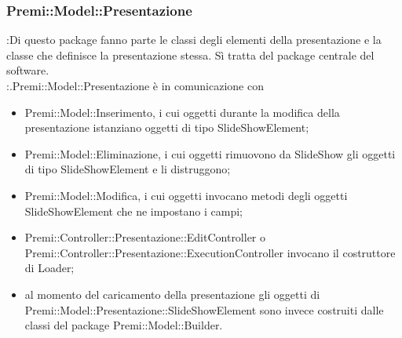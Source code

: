 {{{                    
                    
                     \subsubsection{Premi::Model::Presentazione}{
		\textbf{\tipo}:Di questo package fanno parte le classi degli elementi della presentazione e la classe che definisce la presentazione stessa. Sì tratta del package centrale del software.\\
		\textbf{\relaz}:.Premi::Model::Presentazione è in comunicazione con 
        \begin{itemize}
        \item Premi::Model::Inserimento, i cui oggetti durante la modifica della presentazione istanziano oggetti di tipo SlideShowElement;
        \item Premi::Model::Eliminazione, i cui oggetti rimuovono da SlideShow gli oggetti di tipo SlideShowElement e li distruggono;
        \item Premi::Model::Modifica, i cui oggetti invocano metodi degli oggetti SlideShowElement che ne impostano i campi;
        \item Premi::Controller::Presentazione::EditController o Premi::Controller::Presentazione::ExecutionController invocano il costruttore di Loader;
  		\item al momento del caricamento della presentazione gli oggetti di Premi::Model::Presentazione::SlideShowElement sono invece costruiti dalle classi del package Premi::Model::Builder.\\
  		\end{itemize}

}}}}
